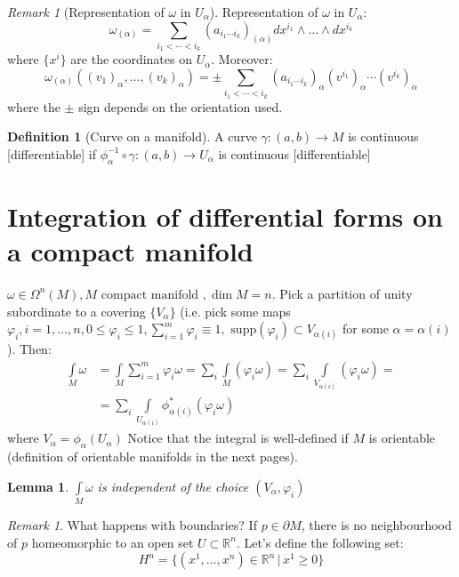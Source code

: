 \documentclass[a4paper,11pt,titlepage]{article}
\numberwithin{equation}{section}
\newtheorem{lemma}[theorem]{Lemma}
\theoremstyle{definition}
\newtheorem{definition}[theorem]{Definition}
\theoremstyle{remark}
\newtheorem{remark}[theorem]{Remark}
\newcommand{\rfield}{\mathbb{R}}
\begin{document}
\begin{remark}[Representation of $\omega$ in $U_{\alpha}$]
  Representation of $\omega$ in $U_{\alpha}$:
  $$\omega_{(\alpha)} = \sum\limits_{i_1 < \cdots < i_k} (a_{i_1 \cdots i_k})_{(\alpha)} dx^{i_1} \wedge \ldots \wedge dx^{i_k}$$
  where $\{x^i\}$ are the coordinates on $U_{\alpha}$.
  Moreover:
  $$\omega_{(\alpha)} ((v_1)_{\alpha}, \ldots, (v_k)_{\alpha}) = \pm \sum\limits_{i_1 < \cdots < i_k} (a_{i_1\cdots i_k})_{\alpha} (v^{i_1})_{\alpha} \cdots (v^{i_k})_{\alpha}$$
  where the $\pm$ sign depends on the orientation used.
\end{remark}

\begin{definition}[Curve on a manifold]
  A curve $\gamma \colon (a, b) \rightarrow M$ is continuous [differentiable] if $\phi_{\alpha}^{-1} \circ \gamma \colon (a, b) \rightarrow U_{\alpha}$ is continuous [differentiable]
\end{definition}
\newpage

\section{Integration of differential forms on a compact manifold}
$\omega \in \Omega^n(M), M \text{ compact manifold }, \dim M=n$. Pick a partition of unity subordinate to a covering $\{V_{\alpha} \}$ (i.e. pick some maps $\varphi_i, i=1, \ldots, n, 0 \le \varphi_i \le 1, \sum_{i=1}^m \varphi_i \equiv 1, \text{ supp}(\varphi_i) \subset V_{\alpha(i)}$ for some $\alpha = \alpha(i)$). Then:
\begin{align}
  \int\limits_M \omega &= \int\limits_M \sum_{i=1}^m \varphi_i \omega = \sum_i \int\limits_M (\varphi_i \omega) = \sum_i \int\limits_{V_{\alpha(i)}} (\varphi_i \omega) = \nonumber \\
  & = \sum_i \int\limits_{U_{\alpha(i)}} \phi^*_{\alpha(i)} (\varphi_i \omega)
\end{align}
where $V_{\alpha} = \phi_{\alpha}(U_{\alpha})$
Notice that the integral is well-defined if $M$ is orientable (definition of orientable manifolds in the next pages).

\begin{lemma}
  $\int\limits_{M} \omega$ is independent of the choice $(V_{\alpha}, \varphi_i)$
\end{lemma}

\begin{remark}
  What happens with boundaries? If $p \in \partial M$, there is no neighbourhood of $p$ homeomorphic to an open set $U \subset \rfield^n$.
  Let's define the following set:
  $$H^n = \{ (x^1, \ldots, x^n) \in \rfield^n \, | \, x^1 \ge 0 \}$$
\end{remark}
\end{document}
